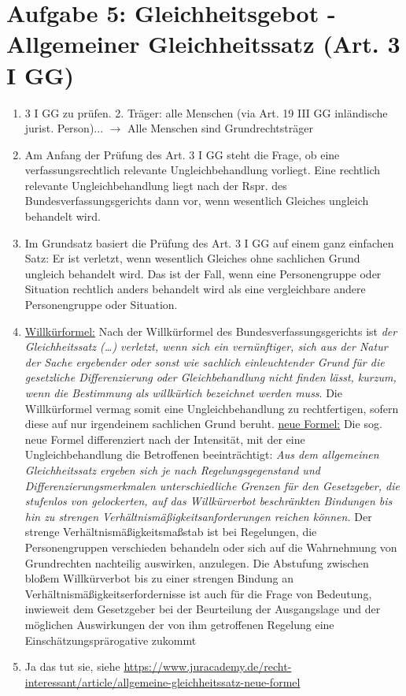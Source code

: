 \documentclass{article}
\begin{document}
	\section*{Aufgabe 5: Gleichheitsgebot - Allgemeiner Gleichheitssatz (Art. 3 I GG)}
	\begin{enumerate}[label=(\alph*)]
		\item 3 I GG zu prüfen. 2. Träger: alle Menschen (via Art. 19 III GG inländische jurist. Person)... $\to$ Alle Menschen sind Grundrechtsträger
		\item Am Anfang der Prüfung des Art. 3 I GG steht die Frage, ob eine verfassungsrechtlich relevante Ungleichbehandlung vorliegt. Eine rechtlich relevante Ungleichbehandlung liegt nach der Rspr. des Bundesverfassungsgerichts dann vor, wenn wesentlich Gleiches ungleich behandelt wird.
		\item Im Grundsatz basiert die Prüfung des Art. 3 I GG auf einem ganz einfachen Satz: Er ist verletzt, wenn wesentlich Gleiches ohne sachlichen Grund ungleich behandelt wird. Das ist der Fall, wenn eine Personengruppe oder Situation rechtlich anders behandelt wird als eine vergleichbare andere Personengruppe oder Situation.
		\item \underline{Willkürformel:} Nach der Willkürformel des Bundesverfassungsgerichts ist \textit{der Gleichheitssatz (…) verletzt, wenn sich ein vernünftiger, sich aus der Natur der Sache ergebender oder sonst wie sachlich einleuchtender Grund für die gesetzliche Differenzierung oder Gleichbehandlung nicht finden lässt, kurzum, wenn die Bestimmung als willkürlich bezeichnet werden muss}. Die Willkürformel vermag somit eine Ungleichbehandlung zu rechtfertigen, sofern diese auf nur irgendeinem sachlichen Grund beruht. \underline{neue Formel:} Die sog. neue Formel differenziert nach der Intensität, mit der eine Ungleichbehandlung die Betroffenen beeinträchtigt: \textit{Aus dem allgemeinen Gleichheitssatz ergeben sich je nach Regelungsgegenstand und Differenzierungsmerkmalen unterschiedliche Grenzen für den Gesetzgeber, die stufenlos von gelockerten, auf das Willkürverbot beschränkten Bindungen bis hin zu strengen Verhältnismäßigkeitsanforderungen reichen können.} Der strenge Verhältnismäßigkeitsmaßstab ist bei Regelungen, die Personengruppen verschieden behandeln oder sich auf die Wahrnehmung von Grundrechten nachteilig auswirken, anzulegen. Die Abstufung zwischen bloßem Willkürverbot bis zu einer strengen Bindung an Verhältnismäßigkeitserfordernisse ist auch für die Frage von Bedeutung, inwieweit dem Gesetzgeber bei der Beurteilung der Ausgangslage und der möglichen Auswirkungen der von ihm getroffenen Regelung eine Einschätzungsprärogative zukommt
		\item Ja das tut sie, siehe \url{https://www.juracademy.de/recht-interessant/article/allgemeine-gleichheitssatz-neue-formel} 
	\end{enumerate}
\end{document}

